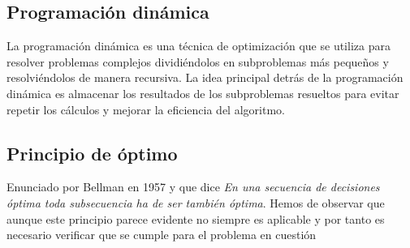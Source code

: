 \subsection{Programación dinámica}
La programación dinámica es una técnica de optimización que se utiliza para resolver problemas complejos dividiéndolos en subproblemas más pequeños y resolviéndolos de manera recursiva. La idea principal detrás de la programación dinámica es almacenar los resultados de los
subproblemas resueltos para evitar repetir los cálculos y mejorar la eficiencia del algoritmo.

\subsection{Principio de óptimo}
Enunciado por Bellman en 1957 y que dice \emph{En una secuencia de decisiones óptima toda subsecuencia ha de ser también
óptima}. Hemos de observar que aunque este principio parece evidente no siempre es
aplicable y por tanto es necesario verificar que se cumple para el problema en
cuestión